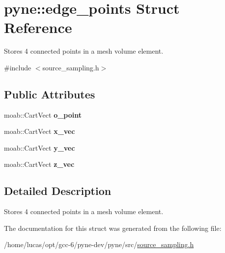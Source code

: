 \hypertarget{structpyne_1_1edge__points}{}\section{pyne\+:\+:edge\+\_\+points Struct Reference}
\label{structpyne_1_1edge__points}


Stores 4 connected points in a mesh volume element.  




{\ttfamily \#include $<$source\+\_\+sampling.\+h$>$}

\subsection*{Public Attributes}
\begin{DoxyCompactItemize}
\item 
moab\+::\+Cart\+Vect {\bfseries o\+\_\+point}\hypertarget{structpyne_1_1edge__points_ada309b6576a990d7e911fb31ee450d64}{}\label{structpyne_1_1edge__points_ada309b6576a990d7e911fb31ee450d64}

\item 
moab\+::\+Cart\+Vect {\bfseries x\+\_\+vec}\hypertarget{structpyne_1_1edge__points_ace3786aead7c2cbce033bd48c84df18b}{}\label{structpyne_1_1edge__points_ace3786aead7c2cbce033bd48c84df18b}

\item 
moab\+::\+Cart\+Vect {\bfseries y\+\_\+vec}\hypertarget{structpyne_1_1edge__points_a5a7e7f46555011e67e5b55c0a8af20f1}{}\label{structpyne_1_1edge__points_a5a7e7f46555011e67e5b55c0a8af20f1}

\item 
moab\+::\+Cart\+Vect {\bfseries z\+\_\+vec}\hypertarget{structpyne_1_1edge__points_a63554c3a4e3b789665d686dc9af79f85}{}\label{structpyne_1_1edge__points_a63554c3a4e3b789665d686dc9af79f85}

\end{DoxyCompactItemize}


\subsection{Detailed Description}
Stores 4 connected points in a mesh volume element. 

The documentation for this struct was generated from the following file\+:\begin{DoxyCompactItemize}
\item 
/home/lucas/opt/gcc-\/6/pyne-\/dev/pyne/src/\hyperlink{source__sampling_8h}{source\+\_\+sampling.\+h}\end{DoxyCompactItemize}
